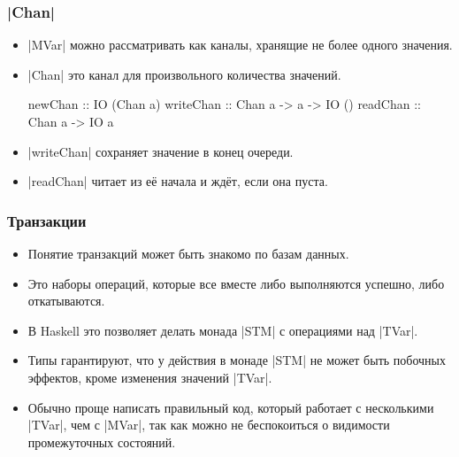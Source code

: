 \documentclass[11pt]{beamer}
\begin{document}
\begin{frame}[fragile]
  \frametitle{\haskinline|Chan|}
  \begin{itemize}
    \item \haskinline|MVar| можно рассматривать как каналы, хранящие не более одного значения.
    \item \haskinline|Chan| это канал для произвольного количества значений.
          \begin{haskell}
        newChan :: IO (Chan a)
        writeChan :: Chan a -> a -> IO () 
        readChan :: Chan a -> IO a
    \end{haskell}
    \item \haskinline|writeChan| сохраняет значение в конец очереди.
    \item \haskinline|readChan| читает из её начала и ждёт, если она пуста.
  \end{itemize}
\end{frame}

\begin{frame}[fragile]
  \frametitle{Транзакции}
  \begin{itemize}
    \item Понятие транзакций может быть знакомо по базам данных.
    \item Это наборы операций, которые все вместе либо выполняются успешно, либо откатываются.
    \item В Haskell это позволяет делать монада \haskinline|STM| с операциями над \haskinline|TVar|.
    \item Типы гарантируют, что у действия в монаде \haskinline|STM| не может быть побочных эффектов, кроме изменения значений \haskinline|TVar|.
    \item Обычно проще написать правильный код, который работает с несколькими \haskinline|TVar|, чем с \haskinline|MVar|, так как можно не беспокоиться о видимости промежуточных состояний.
  \end{itemize}
\end{frame}
\end{document}
